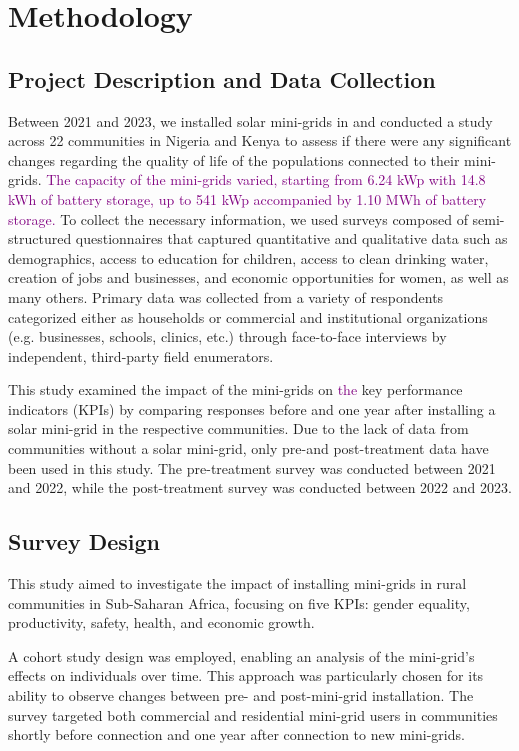 \section{Methodology}
\label{sec:methodology}
\subsection{Project Description and Data Collection}
Between 2021 and 2023, we installed solar mini-grids in and conducted a study across 22 communities in Nigeria and Kenya to assess if there were any significant changes regarding the quality of life of the populations connected to their mini-grids. \textcolor{purple}{The capacity of the mini-grids varied, starting from 6.24 kWp with 14.8 kWh of battery storage, up to 541 kWp accompanied by 1.10 MWh of battery storage.} To collect the necessary information, we used surveys composed of semi-structured questionnaires that captured quantitative and qualitative data such as demographics, access to education for children, access to clean drinking water, creation of jobs and businesses, and economic opportunities for women, as well as many others. Primary data was collected from a variety of respondents categorized either as households or commercial and institutional organizations (e.g. businesses, schools, clinics, etc.) through face-to-face interviews by independent, third-party field enumerators.

This study examined the impact of the mini-grids on \textcolor{purple}{the} key performance indicators (KPIs) by comparing responses before and one year after installing a solar mini-grid in the respective communities. Due to the lack of data from communities without a solar mini-grid, only pre-and post-treatment data have been used in this study. The pre-treatment survey was conducted between 2021 and 2022, while the post-treatment survey was conducted between 2022 and 2023.

\subsection{Survey Design} 
This study aimed to investigate the impact of installing mini-grids in rural communities in Sub-Saharan Africa, focusing on five KPIs: gender equality, productivity, safety, health, and economic growth.

A cohort study design was employed, enabling an analysis of the mini-grid's effects on individuals over time. This approach was particularly chosen for its ability to observe changes between pre- and post-mini-grid installation. The survey targeted both commercial and residential mini-grid users in communities shortly before connection and one year after connection to new mini-grids.

